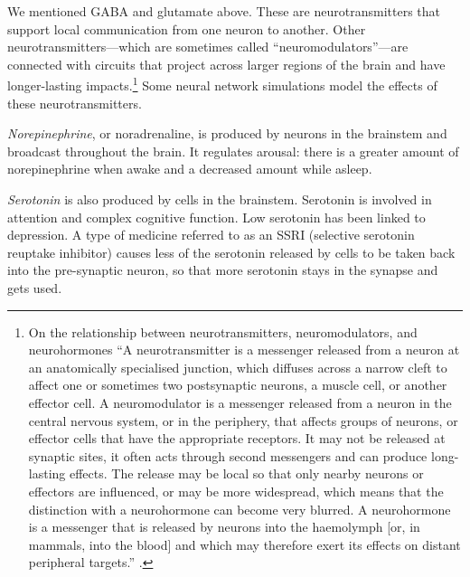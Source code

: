 We mentioned GABA and glutamate above. These are neurotransmitters that support local communication from one neuron to another. Other neurotransmitters---which are sometimes called ``neuromodulators''---are connected with circuits that project across larger regions of the brain and have longer-lasting impacts.\footnote{On the relationship between neurotransmitters, neuromodulators, and neurohormones  ``A neurotransmitter is a messenger released from a neuron at an anatomically specialised junction, which diffuses across a narrow cleft to affect one or sometimes two postsynaptic neurons, a muscle cell, or another effector cell. A neuromodulator is a messenger released from a neuron in the central nervous system, or in the periphery, that affects groups of neurons, or effector cells that have the appropriate receptors. It may not be released at synaptic sites, it often acts through second messengers and can produce long-lasting effects. The release may be local so that only nearby neurons or effectors are influenced, or may be more widespread, which means that the distinction with a neurohormone can become very blurred. A neurohormone is a messenger that is released by neurons into the haemolymph [or, in mammals, into the blood] and which may therefore exert its effects on distant peripheral targets.'' \cite{burrows1996neurobiology}.}   Some neural network simulations model the effects of these neurotransmitters.

\emph{Norepinephrine}, or noradrenaline, is produced by neurons in the brainstem and broadcast throughout the brain. It regulates arousal: there is a greater amount of norepinephrine when awake and a decreased amount while asleep. 


\emph{Serotonin} is also produced by cells in the brainstem. Serotonin is involved in attention and complex cognitive function. Low serotonin has been linked to depression. A type of medicine referred to as an SSRI (selective serotonin reuptake inhibitor) causes less of the serotonin released by cells to be taken back into the pre-synaptic neuron, so that more serotonin stays in the synapse and gets used. 

